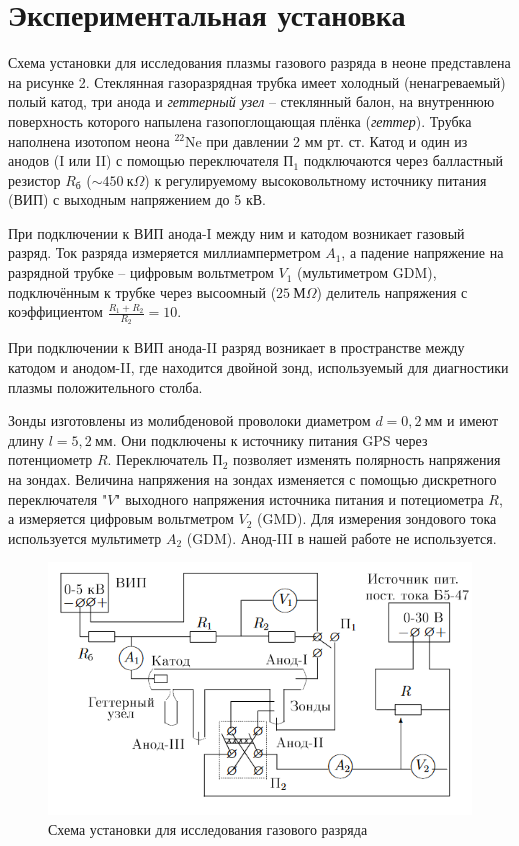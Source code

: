 \documentclass[14pt, a4paper]{report}
\begin{document}
\section*{Экспериментальная установка}

Схема установки для исследования плазмы газового разряда в неоне представлена на рисунке 2. Стеклянная газоразрядная трубка имеет холодный (ненагреваемый) полый катод, три анода и \textit{геттерный узел} -- стеклянный балон, на внутреннюю поверхность которого напылена газопоглощающая плёнка (\textit{геттер}). Трубка наполнена изотопом неона ${}^{22}\text{Ne}$ при давлении 2 мм рт. ст. Катод и один из анодов (I или II) с помощью переключателя $\text{П}_1$ подключаются через балластный резистор $R_{\text{б}}$ ($\sim450~\text{к}\Omega$) к регулируемому высоковольтному источнику питания (ВИП) с выходным напряжением до 5 кВ.


При подключении к ВИП анода-I между ним и катодом возникает газовый разряд. Ток разряда измеряется миллиамперметром $A_1$, а падение напряжение на разрядной трубке -- цифровым вольтметром $V_1$ (мультиметром GDM), подключённым к трубке через высоомный ($25~\text{М}\Omega$) делитель напряжения с коэффициентом $\frac{R_1+R_2}{R_2}=10$.

При подключении к ВИП анода-II разряд возникает в пространстве между катодом и анодом-II, где находится двойной зонд, используемый для диагностики плазмы положительного столба.

Зонды изготовлены из молибденовой проволоки диаметром $d=0,2~\text{мм}$ и имеют длину $l=5,2~\text{мм}$. Они подключены к источнику питания GPS через потенциометр $R$. Переключатель $\text{П}_2$ позволяет изменять полярность напряжения на зондах. Величина напряжения на зондах изменяется с помощью дискретного переключателя "$V$" выходного напряжения источника питания и потециометра $R$, а измеряется цифровым вольтметром $V_2$ (GMD). Для измерения зондового тока используется мультиметр $A_2$ (GDM). Анод-III в нашей работе не используется.

\begin{figure}[h]
\centering
\includegraphics[scale=0.6]{images/351_5.png}
\caption{Схема установки для исследования газового разряда}
\end{figure}
\end{document}
